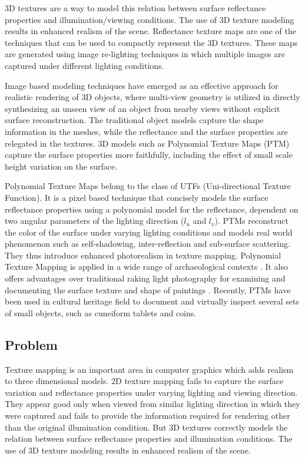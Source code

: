 
3D textures are a way to model this relation between surface reflectance
properties and illumination/viewing conditions.
The use of 3D texture modeling
results in enhanced realism of the scene. Reflectance texture maps are one of
the techniques that can be used to compactly represent the 3D textures. These
maps are generated using image re-lighting techniques \cite{C5,C4,C2} in which
multiple images are captured under different lighting conditions.

Image based modeling techniques \cite{C8,C6,C7} have emerged as
an effective approach for realistic rendering of 3D objects,
where multi-view geometry is utilized in directly synthesizing
an unseen view of an object from nearby views without
explicit surface reconstruction. The traditional object models capture the shape information in the meshes,
while the reflectance and the surface properties are relegated in the textures. 3D models such as
Polynomial Texture Maps (PTM) capture the
surface properties more faithfully, including the effect of small scale height variation on the surface.

Polynomial Texture Maps \cite{C4} belong to the class of UTFs (Uni-directional Texture Function). It is a pixel
based technique that concisely models the surface reflectance properties using a
polynomial model for the reflectance, dependent on two angular parameters of the
lighting direction ($l_u$ and $l_v$). PTMs reconstruct the color of the surface under varying
lighting conditions and models real world phenomenon such as
self-shadowing, inter-reflection and sub-surface scattering. They thus introduce
enhanced photorealism in texture mapping.
Polynomial Texture Mapping is applied in a wide
range of archaeological contexts \cite{C14}.
It also offers advantages over traditional raking
light photography for examining and
documenting the surface texture and
shape of paintings \cite{C13}.
Recently, PTMs have been used in cultural heritage field to document and virtually inspect
several sets of small objects, such as cuneiform tablets and coins.

\subsection{Problem}
Texture mapping is an important area in computer graphics which adds realism to three dimensional
models. 2D texture mapping fails to capture the surface variation and reflectance properties under
varying lighting and viewing direction. They appear good only when viewed from similar lighting
direction in which they were captured and fails to provide the information required for rendering other than the original
illumination condition. But 3D textures correctly models the relation between surface reflectance
properties and illumination conditions. The use of 3D texture modeling
results in enhanced realism of the scene.

